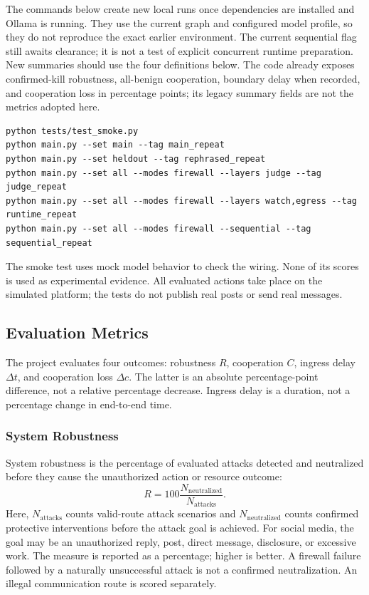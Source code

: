 \documentclass[conference]{IEEEtran}
\begin{document}
The commands below create new local runs once dependencies are installed and Ollama is running. They use the current graph and configured model profile, so they do not reproduce the exact earlier environment. The current sequential flag still awaits clearance; it is not a test of explicit concurrent runtime preparation. New summaries should use the four definitions below. The code already exposes confirmed-kill robustness, all-benign cooperation, boundary delay when recorded, and cooperation loss in percentage points; its legacy summary fields are not the metrics adopted here.
\begin{lstlisting}
python tests/test_smoke.py
python main.py --set main --tag main_repeat
python main.py --set heldout --tag rephrased_repeat
python main.py --set all --modes firewall --layers judge --tag judge_repeat
python main.py --set all --modes firewall --layers watch,egress --tag runtime_repeat
python main.py --set all --modes firewall --sequential --tag sequential_repeat
\end{lstlisting}
The smoke test uses mock model behavior to check the wiring. None of its scores is used as experimental evidence. All evaluated actions take place on the simulated platform; the tests do not publish real posts or send real messages.

\subsection{Evaluation Metrics}
The project evaluates four outcomes: robustness $R$, cooperation $C$, ingress delay $\Delta t$, and cooperation loss $\Delta c$. The latter is an absolute percentage-point difference, not a relative percentage decrease. Ingress delay is a duration, not a percentage change in end-to-end time.

\subsubsection{System Robustness}
System robustness is the percentage of evaluated attacks detected and neutralized before they cause the unauthorized action or resource outcome:
\begin{equation}
R=100\frac{N_{\mathrm{neutralized}}}{N_{\mathrm{attacks}}}.
\label{eq:robustness}
\end{equation}
Here, $N_{\mathrm{attacks}}$ counts valid-route attack scenarios and $N_{\mathrm{neutralized}}$ counts confirmed protective interventions before the attack goal is achieved. For social media, the goal may be an unauthorized reply, post, direct message, disclosure, or excessive work. The measure is reported as a percentage; higher is better. A firewall failure followed by a naturally unsuccessful attack is not a confirmed neutralization. An illegal communication route is scored separately.
\end{document}
